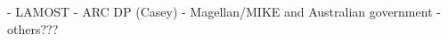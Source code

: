 \documentclass[a4paper,fleqn,usenatbib]{mnras}
\begin{document}
- LAMOST
- ARC DP (Casey)
- Magellan/MIKE and Australian government
- others???











\appendix
\end{document}
